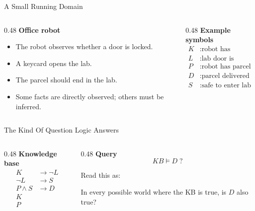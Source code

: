 \documentclass[aspectratio=169,11pt]{beamer}
\newcommand{\minihead}[1]{\textbf{\color{unswblue}#1}}
\begin{document}
\begin{frame}{A Small Running Domain}
  \begin{columns}[T,onlytextwidth]
    \begin{column}{0.48\textwidth}
      \minihead{Office robot}
      \begin{itemize}
        \item The robot observes whether a door is locked.
        \item A keycard opens the lab.
        \item The parcel should end in the lab.
        \item Some facts are directly observed; others must be inferred.
      \end{itemize}
    \end{column}
    \begin{column}{0.48\textwidth}
      \minihead{Example symbols}
      \begin{align*}
        K &: \text{robot has keycard}\\
        L &: \text{lab door is locked}\\
        P &: \text{robot has parcel}\\
        D &: \text{parcel delivered}\\
        S &: \text{safe to enter lab}
      \end{align*}
    \end{column}
  \end{columns}
\end{frame}

\begin{frame}{The Kind Of Question Logic Answers}
  \begin{columns}[T,onlytextwidth]
    \begin{column}{0.48\textwidth}
      \minihead{Knowledge base}
      \begin{align*}
        K &\rightarrow \neg L\\
        \neg L &\rightarrow S\\
        P \land S &\rightarrow D\\
        K\\
        P
      \end{align*}
    \end{column}
    \begin{column}{0.48\textwidth}
      \minihead{Query}
      \[
        KB \models D \; ?
      \]

      Read this as:

      \medskip
      In every possible world where the KB is true, is $D$ also true?
    \end{column}
  \end{columns}
\end{frame}
\end{document}
